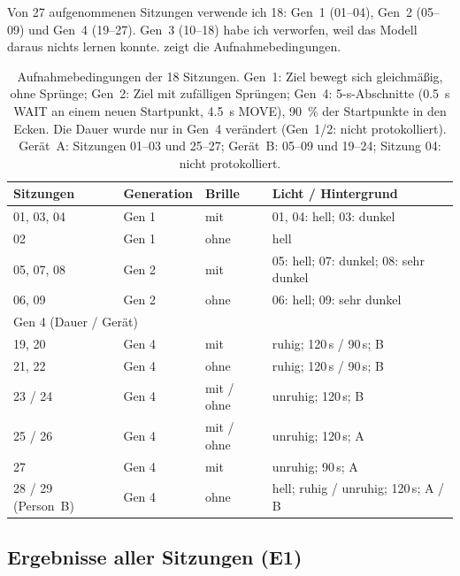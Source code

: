 Von 27 aufgenommenen Sitzungen verwende ich 18: Gen~1 (01--04), Gen~2 (05--09)
und Gen~4 (19--27). Gen~3 (10--18) habe ich verworfen, weil das Modell daraus
nichts lernen konnte.  zeigt die
Aufnahmebedingungen.

\begin{table}[htbp]
  \centering
  \caption[Aufnahmebedingungen der 18 Sitzungen]{Aufnahmebedingungen der 18 Sitzungen. Gen~1: Ziel bewegt sich
           gleichmäßig, ohne Sprünge; Gen~2: Ziel mit zufälligen Sprüngen;
           Gen~4: 5-s-Abschnitte (\SI{0,5}{\second} WAIT an einem neuen
           Startpunkt, \SI{4,5}{\second} MOVE), \SI{90}{\percent} der
           Startpunkte in den Ecken. Die Dauer wurde nur in Gen~4 verändert
           (Gen~1/2: nicht protokolliert). Gerät~A: Sitzungen 01--03 und
           25--27; Gerät~B: 05--09 und 19--24; Sitzung 04: nicht protokolliert.}
  \label{tab:session_conditions}
  \small
  \begin{tabular}{llll}
    \toprule
    Sitzungen & Generation & Brille & Licht / Hintergrund \\
    \midrule
    01, 03, 04 & Gen 1 & mit    & 01, 04: hell; 03: dunkel \\
    02         & Gen 1 & ohne   & hell \\
    05, 07, 08 & Gen 2 & mit    & 05: hell; 07: dunkel; 08: sehr dunkel \\
    06, 09     & Gen 2 & ohne   & 06: hell; 09: sehr dunkel \\
    \midrule
    \multicolumn{4}{l}{Gen 4 \quad (Dauer / Gerät)} \\
    19, 20 & Gen 4 & mit    & ruhig; 120\,s / 90\,s; B \\
    21, 22 & Gen 4 & ohne   & ruhig; 120\,s / 90\,s; B \\
    23 / 24 & Gen 4 & mit / ohne & unruhig; 120\,s; B \\
    25 / 26 & Gen 4 & mit / ohne & unruhig; 120\,s; A \\
    27     & Gen 4 & mit    & unruhig; 90\,s; A \\
    \midrule
    28 / 29 (Person~B) & Gen 4 & ohne & hell; ruhig / unruhig; 120\,s; A / B \\
    \bottomrule
  \end{tabular}
\end{table}

\subsection{Ergebnisse aller Sitzungen (E1)}
\label{sec:sessions_results}

